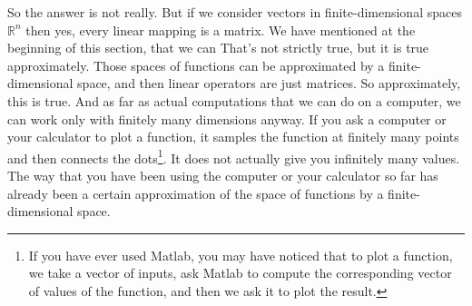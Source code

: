 So the answer is not really.  But if we consider vectors in
finite-dimensional spaces ${\mathbb R}^n$ then yes, every linear mapping is a
matrix.
We have mentioned at the beginning of this section, that we can
  That's not strictly true, but
it is true
approximately.  Those  spaces of functions can
be approximated by a finite-dimensional space, and then linear operators
are just matrices.  So approximately, this is true.  And as far as actual
computations that we can do on a computer, we can work only with
finitely many dimensions anyway.  If you ask a computer or your calculator
to plot a function,
it samples the function at finitely many points and then
connects the dots\footnote{If you have ever used Matlab, you may have
noticed that to plot a function, we take a vector of inputs, ask Matlab
to compute the corresponding vector of values of the function, and then we ask
it to plot the result.}.
It does not actually give you infinitely many values.
The way that you have been using the computer or your calculator so far has
already been a certain approximation of the space of functions by a
finite-dimensional space.

\medskip

